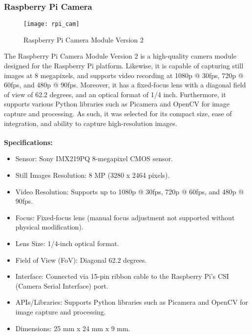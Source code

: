 \subsubsection{Raspberry Pi Camera}
\begin{figure}[!htbp]
	\centering
	\texttt{[image: rpi\_cam]}
	\caption{Raspberry Pi Camera Module Version 2}
	\label{fig:rpi_cam_fig}
\end{figure}
The Raspberry Pi Camera Module Version 2 is a high-quality camera module designed for the Raspberry Pi platform.
Likewise, it is capable of capturing still images at 8 megapixels, and supports video recording at 1080p @ 30fps, 
720p @ 60fps, and 480p @ 90fps. 
Moreover, it has a fixed-focus lens with a diagonal field of view of 62.2 degrees, and an optical format of 1/4 inch. 
Furthermore, it supports various Python libraries such as Picamera and OpenCV for image capture and processing.
As such, it was selected for its compact size, ease of integration, and ability to capture high-resolution images. 
\\
\\
\textbf{Specifications:}
\begin{itemize}
    \item Sensor: Sony IMX219PQ 8-megapixel CMOS sensor.
    \item Still Images Resolution: 8 MP (3280 x 2464 pixels).
    \item Video Resolution: Supports up to 1080p @ 30fps, 720p @ 60fps, and 480p @ 90fps.
    \item Focus: Fixed-focus lens (manual focus adjustment not supported without physical modification).
    \item Lens Size: 1/4-inch optical format.
    \item Field of View (FoV): Diagonal 62.2 degrees.
    \item Interface: Connected via 15-pin ribbon cable to the Raspberry Pi's CSI (Camera Serial Interface) port.
    \item APIs/Libraries: Supports Python libraries such as Picamera and OpenCV for image capture and processing.
    \item Dimensions: 25 mm x 24 mm x 9 mm.
\end{itemize}

